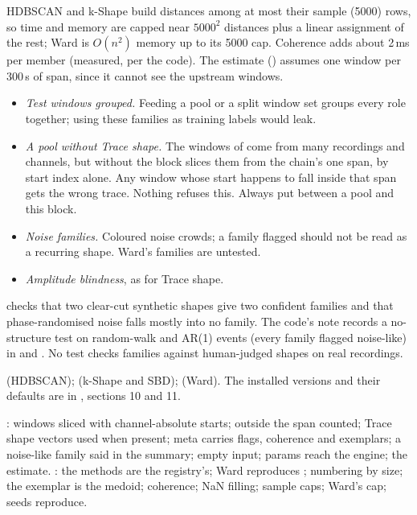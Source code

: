 HDBSCAN and k-Shape build distances among at most their sample (5000) rows, so time and memory
are capped near $5000^2$ distances plus a linear assignment of the rest; Ward is $O(n^2)$ memory
up to its 5000 cap. Coherence adds about 2\,ms per member (measured, per the code). The estimate
() assumes one window per 300\,s of span, since it cannot see the
upstream windows.

\begin{itemize}
\item \emph{Test windows grouped.} Feeding a pool or a split window set groups every role
  together; using these families as training labels would leak.
\item \emph{A pool without Trace shape.} The windows of  come
  from many recordings and channels, but without  the block slices them from the
  chain's one span, by start index alone. Any window whose start happens to fall inside that span
  gets the wrong trace. Nothing refuses this. Always put 
  between a pool and this block.
\item \emph{Noise families.} Coloured noise crowds; a family flagged  should not
  be read as a recurring shape. Ward's families are untested.
\item \emph{Amplitude blindness}, as for Trace shape.
\end{itemize}

 checks that two clear-cut synthetic shapes give two confident
families and that phase-randomised noise falls mostly into no family. The code's
 note records a no-structure test on random-walk and AR(1) events (every
family flagged noise-like) in  and
. No test checks families against human-judged shapes
on real recordings.

\citet{campello2013density} (HDBSCAN); \citet{paparrizos2015kshape} (k-Shape and SBD);
\citet{ward1963hierarchical} (Ward). The installed versions and their defaults are in
, sections 10 and 11.

: windows sliced with channel-absolute starts; outside
the span counted; Trace shape vectors used when present; meta carries flags, coherence and
exemplars; a noise-like family said in the summary; empty input; params reach the engine; the
estimate. : the methods are the registry's; Ward reproduces
; numbering by size; the exemplar is the medoid; coherence; NaN filling;
sample caps; Ward's cap; seeds reproduce.
